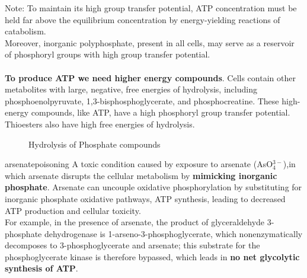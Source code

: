 \documentclass[../main.tex]{subfiles}
\begin{document}
Note: To maintain its high group transfer potential, ATP concentration must be held far above the equilibrium concentration by energy-yielding reactions of catabolism.\\
Moreover, inorganic polyphosphate, present in all cells, may serve as a reservoir of phosphoryl groups with high group transfer potential. \\
\\
\textbf{To produce ATP we need higher energy compounds}. Cells contain other metabolites with large, negative, free energies of hydrolysis, including phosphoenolpyruvate, 1,3-bisphosphoglycerate, and phosphocreatine. These high-energy compounds, like ATP, have a high phosphoryl group transfer potential. Thioesters also have high free energies of hydrolysis.
\begin{figure}[H]
	\centering
	\caption{Hydrolysis of Phosphate compounds}
\end{figure}

\begin{RemarkWithTitel}{\gls{arsenatepoisoning}}
	A toxic condition caused by exposure to arsenate (AsO$_4^{3-}$),in which arsenate disrupts the cellular metabolism by \textbf{mimicking inorganic phosphate}. Arsenate can uncouple oxidative phosphorylation by substituting for inorganic phosphate oxidative pathways, ATP synthesis, leading to decreased ATP production and cellular toxicity.\\
	For example, in the presence of arsenate, the product of glyceraldehyde 3-phosphate dehydrogenase is 1-arseno-3-phosphoglycerate, which nonenzymatically decomposes to 3-phosphoglycerate and arsenate; this substrate for the phosphoglycerate kinase is therefore bypassed, which leads in \textbf{no net glycolytic synthesis of ATP}.
\end{RemarkWithTitel}
\end{document}
